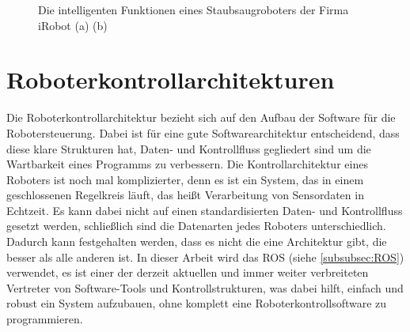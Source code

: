\begin{figure}[h]
  \centering
  \qquad
  \caption{Die intelligenten Funktionen eines Staubsaugroboters der Firma iRobot (a)\cite{iRootKarte.2021} (b)\cite{iRobotHindernissErkennung.2021}}
  \label{fig:intelligenteFunktionenMobilerRoboter}
\end{figure}



\section{Roboterkontrollarchitekturen}\label{subsec:Roboterkontrollarchitekturen}
Die Roboterkontrollarchitektur bezieht sich auf den Aufbau der Software für die Robotersteuerung. Dabei ist für eine gute Softwarearchitektur entscheidend, dass diese klare Strukturen hat, Daten- und Kontrollfluss gegliedert sind um die Wartbarkeit eines Programms zu verbessern. Die Kontrollarchitektur eines Roboters ist noch mal komplizierter, denn es ist ein System, das in einem geschlossenen Regelkreis läuft, das heißt Verarbeitung von Sensordaten in Echtzeit. Es kann dabei nicht auf einen standardisierten Daten- und Kontrollfluss gesetzt werden, schließlich sind die Datenarten jedes Roboters unterschiedlich. Dadurch kann festgehalten werden, dass es nicht die eine Architektur gibt, die besser als alle anderen ist. In dieser Arbeit wird das ROS (siehe \autoref{subsubsec:ROS}) verwendet, es ist einer der derzeit aktuellen und immer weiter verbreiteten Vertreter von Software-Tools und Kontrollstrukturen, was dabei hilft, einfach und robust ein System aufzubauen, ohne komplett eine Roboterkontrollsoftware zu programmieren. \cite[S.317ff]{RobotikSichtInformatik.2012}


